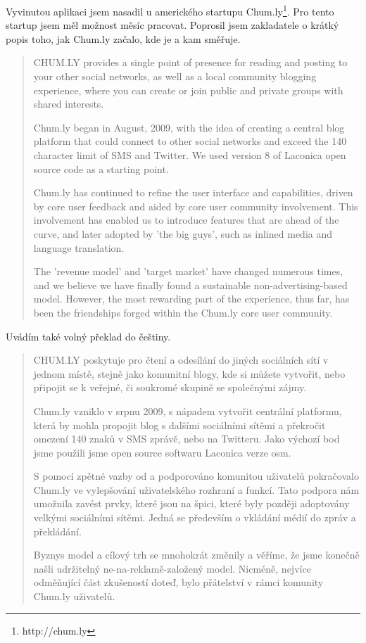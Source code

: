 \documentclass[bc,male,java,dept456]{diploma}						%
\begin{document}
Vyvinutou aplikaci jsem nasadil u amerického startupu Chum.ly\footnote{http://chum.ly}. Pro tento startup jsem měl možnost měsíc pracovat. Poprosil jsem zakladatele o krátký popis toho, jak Chum.ly začalo, kde je a kam směřuje.

\begin{quotation}
CHUM.LY provides a single point of presence for reading and posting to your other social networks, as well as a local community blogging experience, where you can create or join public and private groups with shared interests.

Chum.ly began in August, 2009, with the idea of creating a central blog platform that could connect to other social networks and exceed the 140 character limit of SMS and Twitter. We used version 8 of Laconica open source code as a starting point.

Chum.ly has continued to refine the user interface and capabilities, driven by core user feedback and aided by core user community involvement. This involvement has enabled us to introduce features that are ahead of the curve, and later adopted by 'the big guys', such as inlined media and language translation. 

The 'revenue model' and 'target market' have changed numerous times, and we believe we have finally found a sustainable non-advertising-based model. However, the most rewarding part of the experience, thus far, has been the friendships forged within the Chum.ly core user community.
\end{quotation}

Uvádím také volný překlad do češtiny.

\begin{quote}
CHUM.LY poskytuje pro čtení a odesílání do jiných sociálních sítí v jednom místě, stejně jako komunitní blogy, kde si můžete vytvořit, nebo připojit se k veřejné, či soukromé skupině se společnými zájmy.

Chum.ly vzniklo v srpnu 2009, s nápadem vytvořit centrální platformu, která by mohla propojit blog s dalšími sociálními sítěmi a překročit omezení 140 znaků v SMS zprávě, nebo na Twitteru. Jako výchozí bod jsme použili jsme open source softwaru Laconica verze osm.

S pomocí zpětné vazby od a podporováno komunitou uživatelů pokračovalo Chum.ly ve vylepšování uživatelského rozhraní a funkcí. Tato podpora nám umožnila zavést prvky, které jsou na špici, které byly později adoptovány velkými sociálními sítěmi. Jedná se především o vkládání médií do zpráv a překládání.

Byznys model a cílový trh se mnohokrát změnily a věříme, že jsme konečně našli udržitelný ne-na-reklamě-založený model. Nicméně, nejvíce odměňující část zkušeností doteď, bylo přátelství v rámci komunity Chum.ly uživatelů.
\end{quote}
\end{document}
